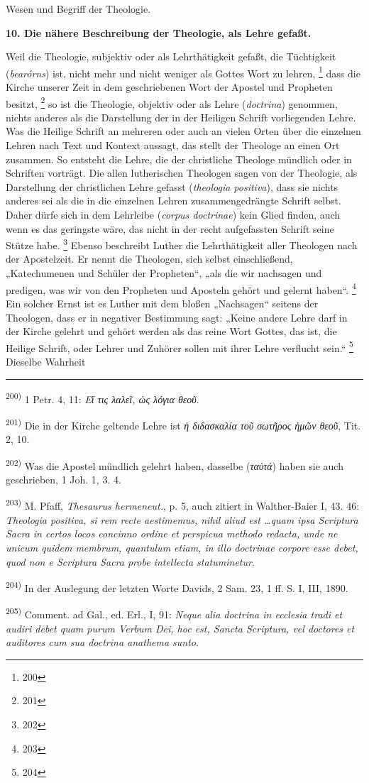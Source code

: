  Wesen und Begriff der Theologie. \par \textbf{10. Die nähere Beschreibung der Theologie, als Lehre gefaßt.} \par Weil die Theologie, subjektiv oder als Lehrthätigkeit gefaßt, die Tüchtigkeit (\textit{bearórns}) ist, nicht mehr und nicht weniger als Gottes Wort zu lehren, \footnote{200} dass die Kirche unserer Zeit in dem geschriebenen Wort der Apostel und Propheten besitzt, \footnote{201} so ist die Theologie, objektiv oder als Lehre (\textit{doctrina}) genommen, nichts anderes als die Darstellung der in der Heiligen Schrift vorliegenden Lehre. Was die Heilige Schrift an mehreren oder auch an vielen Orten über die einzelnen Lehren nach Text und Kontext aussagt, das stellt der Theologe an einen Ort zusammen. So entsteht die Lehre, die der christliche Theologe mündlich oder in Schriften vorträgt. Die allen lutherischen Theologen sagen von der Theologie, als Darstellung der christlichen Lehre gefasst (\textit{theologia positiva}), dass sie nichts anderes sei als die in die einzelnen Lehren zusammengedrängte Schrift selbst. Daher dürfe sich in dem Lehrleibe (\textit{corpus doctrinae}) kein Glied finden, auch wenn es das geringste wäre, das nicht in der recht aufgefassten Schrift seine Stütze habe. \footnote{202} Ebenso beschreibt Luther die Lehrthätigkeit aller Theologen nach der Apostelzeit. Er nennt die Theologen, sich selbst einschließend, „Katechumenen und Schüler der Propheten“, „als die wir nachsagen und predigen, was wir von den Propheten und Aposteln gehört und gelernt haben“. \footnote{203} Ein solcher Ernst ist es Luther mit dem bloßen „Nachsagen“ seitens der Theologen, dass er in negativer Bestimmung sagt: „Keine andere Lehre darf in der Kirche gelehrt und gehört werden als das reine Wort Gottes, das ist, die Heilige Schrift, oder Lehrer und Zuhörer sollen mit ihrer Lehre verflucht sein.“ \footnote{204} Dieselbe Wahrheit \par \hrule \par \textsuperscript{200)} 1 Petr. 4, 11: \textit{Εἴ τις λαλεῖ, ὡς λόγια θεοῦ}. \par \textsuperscript{201)} Die in der Kirche geltende Lehre ist \textit{ἡ διδασκαλία τοῦ σωτῆρος ἡμῶν θεοῦ}, Tit. 2, 10. \par \textsuperscript{202)} Was die Apostel mündlich gelehrt haben, dasselbe (\textit{ταὐτά}) haben sie auch geschrieben, 1 Joh. 1, 3. 4. \par \textsuperscript{203)} M. Pfaff, \textit{Thesaurus hermeneut.}, p. 5, auch zitiert in Walther-Baier I, 43. 46: \textit{Theologia positiva, si rem recte aestimemus, nihil aliud est \ldots quam ipsa Scriptura Sacra in certos locos concinno ordine et perspicua methodo redacta, unde ne unicum quidem membrum, quantulum etiam, in illo doctrinae corpore esse debet, quod non e Scriptura Sacra probe intellecta statuminetur}. \par \textsuperscript{204)} In der Auslegung der letzten Worte Davids, 2 Sam. 23, 1 ff. S. I, III, 1890. \par \textsuperscript{205)} Comment. ad Gal., ed. Erl., I, 91: \textit{Neque alia doctrina in ecclesia tradi et audiri debet quam purum Verbum Dei, hoc est, Sancta Scriptura, vel doctores et auditores cum sua doctrina anathema sunto}.